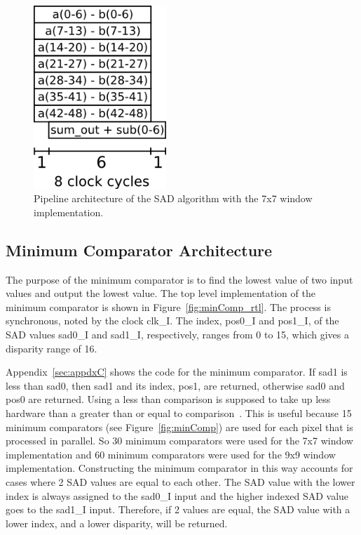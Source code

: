 \begin{figure}
	\begin{center}
		\includegraphics[width=50mm]{figures/sadPipeline7x7.png}
		\captionfonts
		\caption{Pipeline architecture of the SAD algorithm with the 7x7 window implementation.}
		\label{fig:sadPipe7x7}
	\end{center}
\end{figure}

\subsection{Minimum Comparator Architecture}

The purpose of the minimum comparator is to find the lowest value of two input values and output the lowest value. The top level implementation of the minimum comparator is shown in Figure~\ref{fig:minComp_rtl}. The process is synchronous, noted by the clock clk\_I. The index, pos0\_I and pos1\_I, of the SAD values sad0\_I and sad1\_I, respectively, ranges from 0 to 15, which gives a disparity range of 16. 

Appendix~\ref{sec:appdxC} shows the code for the minimum comparator. If sad1 is less than sad0, then sad1 and its index, pos1, are returned, otherwise sad0 and pos0 are returned. Using a less than comparison is supposed to take up less hardware than a greater than or equal to comparison~\cite{lessThan}. This is useful because 15 minimum comparators (see Figure~\ref{fig:minComp}) are used for each pixel that is processed in parallel. So 30 minimum comparators were used for the 7x7 window implementation and 60 minimum comparators were used for the 9x9 window implementation. Constructing the minimum comparator in this way accounts for cases where 2 SAD values are equal to each other. The SAD value with the lower index is always assigned to the sad0\_I input and the higher indexed SAD value goes to the sad1\_I input. Therefore, if 2 values are equal, the SAD value with a lower index, and a lower disparity, will be returned. %

